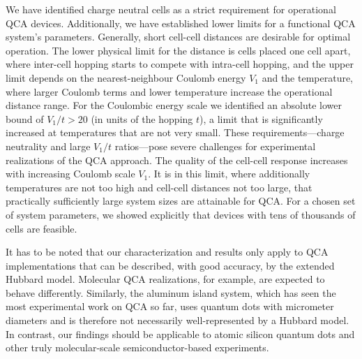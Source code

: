 We have identified charge neutral cells as a strict requirement for operational
QCA devices. Additionally, we have established lower limits for a functional QCA
system's parameters. Generally, short cell-cell distances are desirable for
optimal operation. The lower physical limit for the distance is cells placed one
cell apart, where inter-cell hopping starts to compete with intra-cell hopping,
and the upper limit depends on the nearest-neighbour Coulomb energy $V_1$ and
the temperature, where larger Coulomb terms and lower temperature increase the
operational distance range. For the Coulombic energy scale we identified an
absolute lower bound of $V_1/t > 20$ (in units of the hopping $t$), a limit that
is significantly increased at temperatures that are not very small. These
requirements---charge neutrality and large $V_1/t$ ratios---pose severe
challenges for experimental realizations of the QCA approach. The quality
of the cell-cell response increases with increasing Coulomb scale $V_1$. It is
in this limit, where additionally temperatures are not too high and cell-cell
distances not too large, that practically sufficiently large system sizes are
attainable for QCA. For a chosen set of system parameters, we showed explicitly
that devices with tens of thousands of cells are feasible.

It has to be noted that our characterization and results only apply to QCA
implementations that can be described, with good accuracy, by the extended
Hubbard model. Molecular QCA realizations, for example, are expected to behave
differently. Similarly, the aluminum island system, which has seen the most
experimental work on QCA so far, uses quantum dots with micrometer diameters and
is therefore not necessarily well-represented by a Hubbard model. In contrast,
our findings should be applicable to atomic silicon quantum dots and other truly
molecular-scale semiconductor-based experiments.


